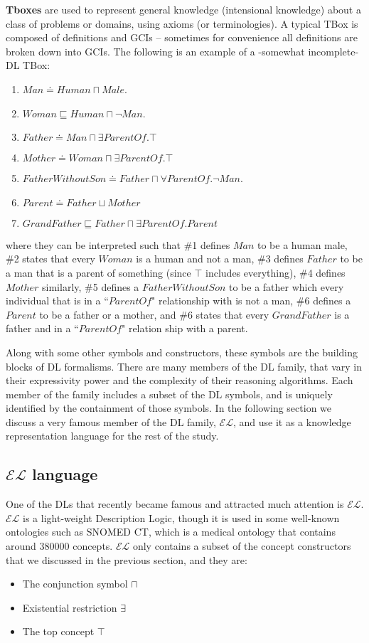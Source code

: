 \textbf{Tboxes} are used to represent general knowledge (intensional knowledge) about a class of problems or domains, using axioms (or terminologies). A typical TBox is composed of definitions and GCIs -- sometimes for convenience all definitions are broken down into GCIs. The following is an example of a -somewhat incomplete- DL TBox:
\begin{enumerate}
\item $Man \doteq Human \sqcap Male$.
\item $Woman \sqsubseteq Human \sqcap \neg Man$.
\item $Father \doteq Man \sqcap \exists ParentOf. \top$
\item $Mother \doteq Woman \sqcap \exists ParentOf. \top$
\item $FatherWithoutSon \doteq Father \sqcap \forall ParentOf. \neg Man$.
\item $Parent \doteq Father \sqcup Mother$
\item $GrandFather \sqsubseteq Father \sqcap \exists ParentOf.Parent$
\end{enumerate}
where they can be interpreted such that \#1 defines $Man$ to be a human male, \#2 states that every $Woman$ is a human and not a man, \#3 defines $Father$ to be a man that is a parent of something (since $\top$ includes everything), \#4 defines $Mother$ similarly, \#5 defines a $FatherWithoutSon$ to be a father which every individual that is in a ``$ParentOf$" relationship with is not a man, \#6 defines a $Parent$ to be a father or a mother, and \#6 states that every $GrandFather$ is a father and in a ``$ParentOf$" relation ship with a parent.

Along with some other symbols and constructors, these symbols are the building blocks of DL formalisms. There are many members of the DL family, that vary in their expressivity power and the complexity of their reasoning algorithms. Each member of the family includes a subset of the DL symbols, and is uniquely identified by the containment of those symbols. In the following section we discuss a very famous member of the DL family, $\mathcal{EL}$, and use it as a knowledge representation language for the rest of the study.


\subsection{$\mathcal{EL}$ language}
One of the DLs that recently became famous and attracted much attention is $\mathcal{EL}$. $\mathcal{EL}$ is a light-weight Description Logic, though it is used in some well-known ontologies such as SNOMED CT, which is a medical ontology that contains around 380000 concepts\cite{new}. $\mathcal{EL}$ only contains a subset of the concept constructors that we discussed in the previous section, and they are:
\begin{itemize}
\item The conjunction symbol $\sqcap$
\item Existential restriction $\exists$
\item The top concept $\top$
\end{itemize}

